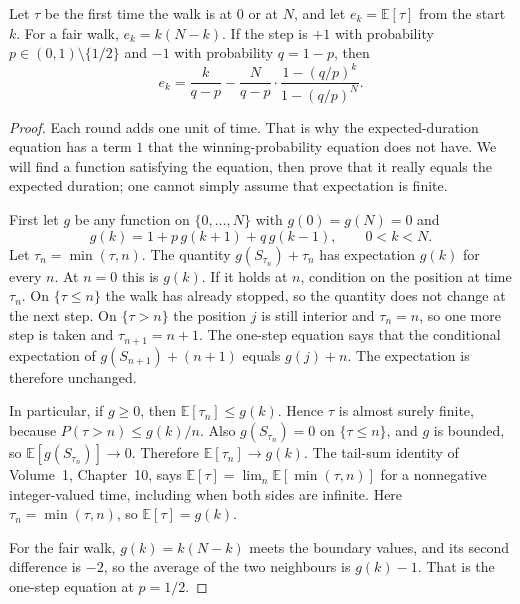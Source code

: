 \begin{proposition}\label{prop:duration}
Let $\tau$ be the first time the walk is at $0$ or at $N$, and let $e_k=\mathbb E[\tau]$ from the start $k$. For a fair walk, $e_k=k(N-k)$. If the step is $+1$ with probability $p\in(0,1)\setminus\{1/2\}$ and $-1$ with probability $q=1-p$, then
\[
 e_k=\frac{k}{q-p}-\frac{N}{q-p}\cdot\frac{1-(q/p)^k}{1-(q/p)^N}.
\]
\end{proposition}
\begin{proof}
Each round adds one unit of time. That is why the expected-duration equation has a term $1$ that the winning-probability equation does not have. We will find a function satisfying the equation, then prove that it really equals the expected duration; one cannot simply assume that expectation is finite.

First let $g$ be any function on $\{0,\ldots,N\}$ with $g(0)=g(N)=0$ and
\[
 g(k)=1+p\,g(k+1)+q\,g(k-1),\qquad 0<k<N.
\]
Let $\tau_n=\min(\tau,n)$. The quantity $g(S_{\tau_n})+\tau_n$ has expectation $g(k)$ for every $n$. At $n=0$ this is $g(k)$. If it holds at $n$, condition on the position at time $\tau_n$. On $\{\tau\le n\}$ the walk has already stopped, so the quantity does not change at the next step. On $\{\tau>n\}$ the position $j$ is still interior and $\tau_n=n$, so one more step is taken and $\tau_{n+1}=n+1$. The one-step equation says that the conditional expectation of $g(S_{n+1})+(n+1)$ equals $g(j)+n$. The expectation is therefore unchanged.

In particular, if $g\ge0$, then $\mathbb E[\tau_n]\le g(k)$. Hence $\tau$ is almost surely finite, because $P(\tau>n)\le g(k)/n$. Also $g(S_{\tau_n})=0$ on $\{\tau\le n\}$, and $g$ is bounded, so $\mathbb E[g(S_{\tau_n})]\to0$. Therefore $\mathbb E[\tau_n]\to g(k)$. The tail-sum identity of Volume~1, Chapter~10, says $\mathbb E[\tau]=\lim_n\mathbb E[\min(\tau,n)]$ for a nonnegative integer-valued time, including when both sides are infinite. Here $\tau_n=\min(\tau,n)$, so $\mathbb E[\tau]=g(k)$.

For the fair walk, $g(k)=k(N-k)$ meets the boundary values, and its second difference is $-2$, so the average of the two neighbours is $g(k)-1$. That is the one-step equation at $p=1/2$.


\end{proof}
